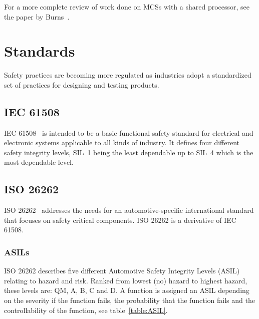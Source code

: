 For a more complete review of work done on MCSs with a shared processor, see the paper by Burns~\cite{burns2016}.




\section{Standards}
Safety practices are becoming more regulated as industries adopt a standardized set of practices for designing and testing products. %

\subsection{IEC 61508}
IEC 61508~\cite{IEC61508} is intended to be a basic functional safety standard for electrical and electronic systems applicable to all kinds of industry. It defines four different safety integrity levels, SIL~1 being the least dependable up to SIL~4 which is the most dependable level.

\subsection{ISO 26262}
ISO 26262~\cite{ISO26262} addresses the needs for an automotive-specific international standard that focuses on safety critical components. ISO 26262 is a derivative of IEC 61508.

\subsubsection{ASILs}
ISO 26262 describes five different Automotive Safety Integrity Levels (ASIL) relating to hazard and risk. Ranked from lowest (no) hazard to highest hazard, these levels are: QM, A, B, C and D. A function is assigned an ASIL depending on the severity if the function fails, the probability that the function fails and the controllability of the function, see table~\ref{table:ASIL}.

